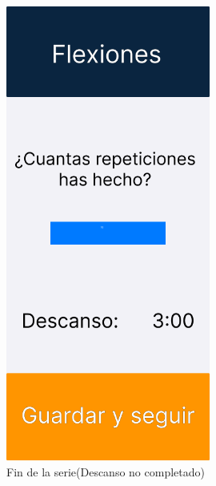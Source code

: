 \begin{figure}[H]
   \centering
    \includegraphics[width=0.6\textwidth]{fotos/Frame 4.png}
    \caption{Fin de la serie(Descanso no completado)}
    \label{fig:Fin de la serie(Descanso no completado)}
\end{figure}
